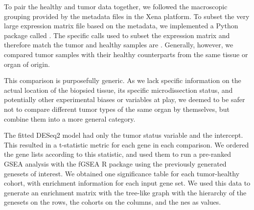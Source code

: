 To pair the healthy and tumor data together, we followed the macroscopic
grouping provided by the metadata files in the Xena platform. To subset the very
large expression matrix file based on the metadata, we implemented a Python
package called . The specific calls used to subset the
expression matrix and therefore match the tumor and healthy samples are
. Generally, however, we compared tumor samples with
their healthy counterparts from the same tissue or organ of origin.

This comparison is purposefully generic. As we lack specific information on the
actual location of the biopsied tissue, its specific microdissection status, and
potentially other experimental biases or variables at play, we deemed to be
safer not to compare different tumor types of the same organ by themselves, but
combine them into a more general category.


The fitted DESeq2 model had only the tumor status variable and the intercept.
This resulted in a t-statistic metric for each gene in each comparison. We
ordered the gene lists according to this statistic, and used them to run a
pre-ranked GSEA analysis with the fGSEA R package
\cite{korotkevichFastGeneSet2021} using the previously generated genesets of
interest.
We obtained one significance table for each tumor-healthy cohort, with
enrichment information for each input gene set. We used this data to generate an
enrichment matrix with the tree-like graph with the hierarchy of the genesets on
the rows, the cohorts on the columns, and the \gls{nes} as values.

